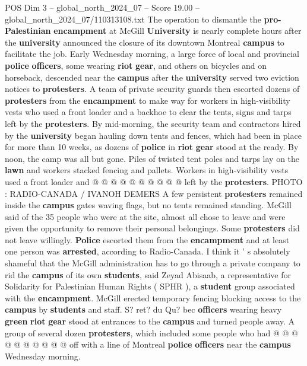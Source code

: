 \begin{textsample}{POS Dim 3 – global\_north\_2024\_07 – Score 19.00 – global\_north\_2024\_07/110313108.txt}  \label{ex:f3_pos_090}
The operation to dismantle the \textbf{pro-Palestinian} \textbf{encampment} at McGill \textbf{University} is nearly complete hours after the \textbf{university} announced the closure of its downtown Montreal \textbf{campus} to facilitate the job.
Early Wednesday morning, a large force of local and provincial \textbf{police} \textbf{officers}, some wearing \textbf{riot} \textbf{gear}, and others on bicycles and on horseback, descended near the \textbf{campus} after the \textbf{university} served two eviction notices to \textbf{protesters}.
A team of private security guards then escorted dozens of \textbf{protesters} from the \textbf{encampment} to make way for workers in high-visibility vests who used a front loader and a backhoe to clear the tents, signs and tarps left by the \textbf{protesters}.
By mid-morning, the security team and contractors hired by the \textbf{university} began hauling down tents and fences, which had been in place for more than 10 weeks, as dozens of \textbf{police} in \textbf{riot} \textbf{gear} stood at the ready.
By noon, the camp was all but gone.
Piles of twisted tent poles and tarps lay on the \textbf{lawn} and workers stacked fencing and pallets.
Workers in high-visibility vests used a front loader and @ @ @ @ @ @ @ @ @ @ left by the \textbf{protesters}.
PHOTO : RADIO-CANADA / IVANOH DEMERS A few persistent \textbf{protesters} remained inside the \textbf{campus} gates waving flags, but no tents remained standing.
McGill said of the 35 people who were at the site, almost all chose to leave and were given the opportunity to remove their personal belongings.
Some \textbf{protesters} did not leave willingly. \textbf{Police} escorted them from the \textbf{encampment} and at least one person was \textbf{arrested}, according to Radio-Canada.
I think it ' s absolutely shameful that the McGill administration has to go through a private company to rid the \textbf{campus} of its own \textbf{students}, said Zeyad Abisaab, a representative for Solidarity for Palestinian Human Rights ( SPHR ), a \textbf{student} group associated with the \textbf{encampment}.
McGill erected temporary fencing blocking access to the \textbf{campus} by \textbf{students} and staff.
S? ret? du Qu? bec \textbf{officers} wearing heavy \textbf{green} \textbf{riot} \textbf{gear} stood at entrances to the \textbf{campus} and turned people away.
A group of several dozen \textbf{protesters}, which included some people who had @ @ @ @ @ @ @ @ @ @ off with a line of Montreal \textbf{police} \textbf{officers} near the \textbf{campus} Wednesday morning.

\end{textsample}

